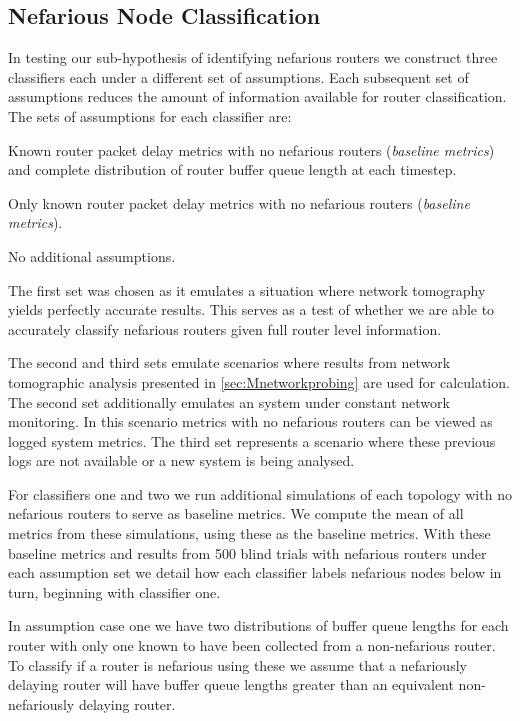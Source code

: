   \subsection{Nefarious Node Classification}
  \label{ssec:MTruevalues}
  In testing our sub-hypothesis of identifying nefarious routers we construct three classifiers each under a different set of assumptions. Each subsequent set of assumptions reduces the amount of information available for router classification. The sets of assumptions for each classifier are:
  \begin{description}[labelindent=1cm]
      \item[Classifier 1:] Known router packet delay metrics with no nefarious routers (\textit{baseline metrics}) and complete distribution of router buffer queue length at each timestep.
      \item[Classifier 2:] Only known router packet delay metrics with no nefarious routers (\textit{baseline metrics}).
      \item[Classifier 3:] No additional assumptions.
  \end{description}
  The first set was chosen as it emulates a situation where network tomography yields perfectly accurate results. This serves as a test of whether we are able to accurately classify nefarious routers given full router level information.\par
  The second and third sets emulate scenarios where results from network tomographic analysis presented in \cref{sec:Mnetworkprobing} are used for calculation. The second set additionally emulates an system under constant network monitoring. In this scenario metrics with no nefarious routers can be viewed as logged system metrics. The third set represents a scenario where these previous logs are not available or a new system is being analysed.\par
  For classifiers one and two we run additional simulations of each topology with no nefarious routers to serve as baseline metrics. We compute the mean of all metrics from these simulations, using these as the baseline metrics. With these baseline metrics and results from 500 blind trials with nefarious routers under each assumption set we detail how each classifier labels nefarious nodes below in turn, beginning with classifier one.\par
  In assumption case one we have two distributions of buffer queue lengths for each router with only one known to have been collected from a non-nefarious router. To classify if a router is nefarious using these we assume that a nefariously delaying router will have buffer queue lengths greater than an equivalent non-nefariously delaying router.\par
